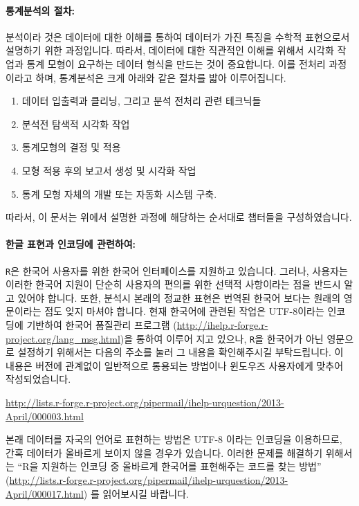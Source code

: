 \paragraph{통계분석의 절차:} 
분석이라 것은 데이터에 대한 이해를 통하여 데이터가 가진 특징을 수학적 표현으로서 설명하기 위한 과정입니다. 
따라서, 데이터에 대한 직관적인 이해를 위해서 시각화 작업과 통계 모형이 요구하는 데이터 형식을 만드는 것이 중요합니다. 
이를 전처리 과정이라고 하며, 통계분석은 크게 아래와 같은 절차를 밟아 이루어집니다.
%
	\begin{enumerate}
	\item 데이터 입출력과 클리닝, 그리고 분석 전처리 관련 테크닉들
	\item 분석전 탐색적 시각화 작업 
	\item 통계모형의 결정 및 적용 
	\item 모형 적용 후의 보고서 생성 및 시각화 작업
	\item 통계 모형 자체의 개발 또는 자동화 시스템 구축.
	\end{enumerate}
	
따라서, 이 문서는 위에서 설명한 과정에 해당하는 순서대로 챕터들을 구성하였습니다. 
%
%

\paragraph{한글 표현과 인코딩에 관련하여:}   
\texttt{R}은 한국어 사용자를 위한 한국어 인터페이스를 지원하고 있습니다. 
그러나, 사용자는 이러한 한국어 지원이 단순히 사용자의 편의를 위한 선택적 사항이라는 점을 반드시 알고 있어야 합니다.
또한, 분석시 본래의 정교한 표현은 번역된 한국어 보다는 원래의 영문이라는 점도 잊지 마셔야 합니다. 
%
현재 한국어에 관련된 작업은 UTF-8이라는 인코딩에 기반하여 한국어 품질관리 프로그램 (\url{http://ihelp.r-forge.r-project.org/lang_msg.html})을 통하여 이루어 지고 있으나, \texttt{R}을 한국어가 아닌 영문으로 설정하기 위해서는 다음의 주소를 눌러 그 내용을 확인해주시길 부탁드립니다. 
이 내용은 버전에 관계없이 일반적으로 통용되는 방법이나 윈도우즈 사용자에게 맞추어 작성되었습니다. 

\url{http://lists.r-forge.r-project.org/pipermail/ihelp-urquestion/2013-April/000003.html}

본래 데이터를 자국의 언어로 표현하는 방법은 UTF-8 이라는 인코딩을 이용하므로, 간혹 데이터가 올바르게 보이지 않을 경우가 있습니다. 
이러한 문제를 해결하기 위해서는 ``R을 지원하는 인코딩 중 올바르게 한국어를 표현해주는 코드를 찾는 방법'' (\url{http://lists.r-forge.r-project.org/pipermail/ihelp-urquestion/2013-April/000017.html}) 를 읽어보시길 바랍니다.

